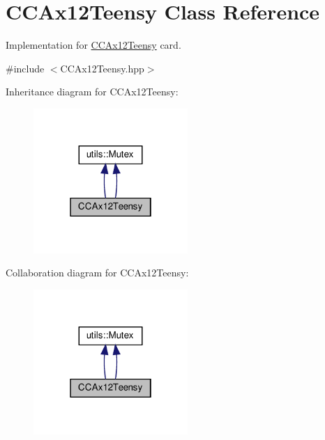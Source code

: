 \hypertarget{classCCAx12Teensy}{}\section{C\+C\+Ax12\+Teensy Class Reference}
\label{classCCAx12Teensy}


Implementation for \hyperlink{classCCAx12Teensy}{C\+C\+Ax12\+Teensy} card.  




{\ttfamily \#include $<$C\+C\+Ax12\+Teensy.\+hpp$>$}



Inheritance diagram for C\+C\+Ax12\+Teensy\+:
\nopagebreak
\begin{figure}[H]
\begin{center}
\leavevmode
\includegraphics[width=166pt]{classCCAx12Teensy__inherit__graph}
\end{center}
\end{figure}


Collaboration diagram for C\+C\+Ax12\+Teensy\+:
\nopagebreak
\begin{figure}[H]
\begin{center}
\leavevmode
\includegraphics[width=166pt]{classCCAx12Teensy__coll__graph}
\end{center}
\end{figure}
